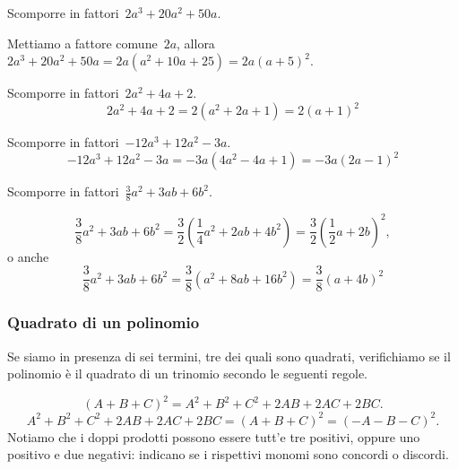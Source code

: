 \begin{exrig}
 \begin{esempio}
Scomporre in fattori~$2a^{3}+20a^{2}+50a$.

Mettiamo a fattore comune~$2a$, 
allora~$2a^{3}+20a^{2}+50a=2a(a^{2}+10a+25)=2a(a+5)^{2}$.
 \end{esempio}

 \begin{esempio}
Scomporre in fattori~$2a^{2}+4a+2$.
\[2a^{2}+4a+2=2\left(a^{2}+2a+1\right)=2(a+1)^{2}\]
 \end{esempio}

 \begin{esempio}
Scomporre in fattori~$-12a^{3}+12a^{2}-3a$.
\[-12a^{3}+12a^{2}-3a=-3a\left(4a^{2}-4a+1\right)=-3a(2a-1)^{2}\]
 \end{esempio}

 \begin{esempio}
Scomporre in fattori~$\frac{3}{8}a^{2}+3ab+6b^{2}$.

\[\frac{3}{8}a^{2}+3ab+6b^{2}=
  \frac{3}{2}\left(\frac{1}{4}a^{2}+2ab+4b^{2}\right)=
  \frac{3}{2}\left(\frac{1}{2}a+2b\right)^{2},\]
o anche
\[\frac{3}{8}a^{2}+3ab+6b^{2}=
  \frac{3}{8}\left(a^{2}+8ab+16b^{2} \right)=
  \frac{3}{8}\left(a+4b\right)^{2}\]
 \end{esempio}
\end{exrig}

\subsubsection{Quadrato di un polinomio}
\label{subsubsec:divpol_quadpol}

Se siamo in presenza di sei termini, tre dei quali sono quadrati, verifichiamo 
se il polinomio è il quadrato di un trinomio secondo le seguenti regole.

\begin{equation*}
(A+B+C)^{2}=A^{2}+B^{2}+C^{2}+2AB+2AC+2BC.
\end{equation*}
\begin{equation*}
A^{2}+B^{2}+C^{2}+2AB+2AC+2BC=(A+B+C)^{2}=(-A-B-C)^{2}.
\end{equation*}
Notiamo che i doppi prodotti possono essere tutt'e tre positivi, oppure uno 
positivo e due negativi: indicano se i rispettivi monomi sono concordi o 
discordi.

